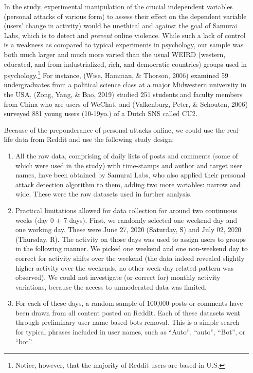\documentclass[10pt,]{scrartcl}
\begin{document}
In the study, experimental manipulation of the crucial independent
variables (personal attacks of various form) to assess their effect on
the dependent variable (users' change in activity) would be unethical
and against the goal of \textsf{Samurai Labs}, which is to detect and
\emph{prevent} online violence. While such a lack of control is a
weakness as compared to typical experiments in psychology, our sample
was both much larger and much more varied than the usual WEIRD (western,
educated, and from industrialized, rich, and democratic countries)
groups used in
psychology.\footnote{Notice, however, that the majority of Reddit users  are based in U.S.}
For instance, (Wise, Hamman, \& Thorson, 2006) examined 59
undergraduates from a political science class at a major Midwestern
university in the USA, (Zong, Yang, \& Bao, 2019) studied 251 students
and faculty members from China who are users of WeChat, and (Valkenburg,
Peter, \& Schouten, 2006) surveyed 881 young users (10-19yo.) of a Dutch
SNS called CU2.

Because of the preponderance of personal attacks online, we could use
the real-life data from \textsf{Reddit} and use the following study
design:

\begin{enumerate}
\def\labelenumi{\arabic{enumi}.}
\item
  All the raw data, comprising of daily lists of posts and comments
  (some of which were used in the study) with time-stamps and author and
  target user names, have been obtained by \textsf{Samurai Labs}, who
  also applied their personal attack detection algorithm to them, adding
  two more variables: \textsf{narrow} and \textsf{wide}. These were the
  raw datasets used in further analysis.
\item
  Practical limitations allowed for data collection for around two
  continuous weeks (day 0 \(\pm\) 7 days). First, we randomly selected
  one weekend day and one working day. These were June 27, 2020
  (Saturday, \textsf{S}) and July 02, 2020 (Thursday, \textsf{R}). The
  activity on those days was used to assign users to groups in the
  following manner. We picked one weekend and one non-weekend day to
  correct for activity shifts over the weekend (the data indeed revealed
  slightly higher activity over the weekends, no other week-day related
  pattern was observed). We could not investigate (or correct for)
  monthly activity variations, because the access to unmoderated data
  was limited.
\item
  For each of these days, a random sample of 100,000 posts or comments
  have been drawn from all content posted on \textsf{Reddit}. Each of
  these datasets went through preliminary user-name based bots removal.
  This is a simple search for typical phrases included in user names,
  such as ``Auto'', ``auto'', ``Bot'', or ``bot''.
\end{enumerate}
\end{document}
